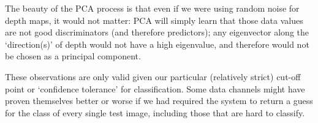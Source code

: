 The beauty of the PCA process is that even if we were using random noise for depth maps, it would not matter: PCA will simply learn that those data values are not good discriminators (and therefore predictors); any eigenvector along the `direction(s)' of depth would not have a high eigenvalue, and therefore would not be chosen as a principal component.

These observations are only valid given our particular (relatively strict) cut-off point or `confidence tolerance' for classification. Some data channels might have proven themselves better or worse if we had required the system to return a guess for the class of every single test image, including those that are hard to classify.

\begin{figure}[hb]
 \centering

 \\


\end{figure}
